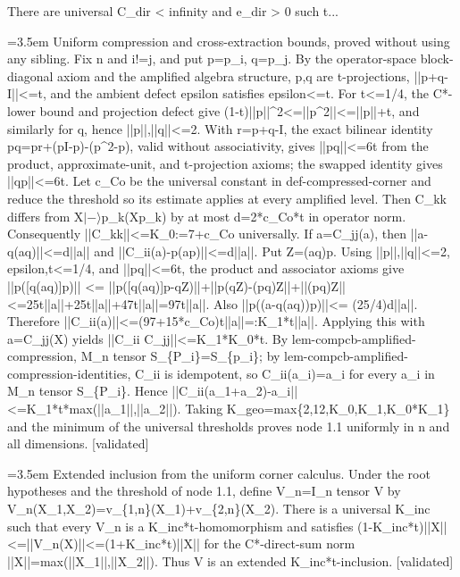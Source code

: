 \documentclass{article}
\newcommand{\step}[1]{\par\noindent\hangindent=3.5em\hangafter=1%
  \makebox[3.5em][l]{\textbf{#1.}}}
\newcommand{\steptag}[1]{\hfill{\small\textsf{[#1]}}}
\begin{document}
\begin{proofbox}{There are universal C\_dir < infinity and e\_dir > 0 such t...}
\step{1.1.2} Uniform compression and cross-extraction bounds, proved without using any sibling. Fix n and i!=j, and put p=p\_i, q=p\_j. By the operator-space block-diagonal axiom and the amplified algebra structure, p,q are t-projections, ||p+q-I||<=t, and the ambient defect epsilon satisfies epsilon<=t. For t<=1/4, the C*-lower bound and projection defect give (1-t)||p||\textasciicircum{}2<=||p\textasciicircum{}2||<=||p||+t, and similarly for q, hence ||p||,||q||<=2. With r=p+q-I, the exact bilinear identity pq=pr+(pI-p)-(p\textasciicircum{}2-p), valid without associativity, gives ||pq||<=6t from the product, approximate-unit, and t-projection axioms; the swapped identity gives ||qp||<=6t. Let c\_Co be the universal constant in def-compressed-corner and reduce the threshold so its estimate applies at every amplified level. Then C\_kk differs from X$|-\rangle$p\_k(Xp\_k) by at most d=2*c\_Co*t in operator norm. Consequently ||C\_kk||<=K\_0:=7+c\_Co universally. If a=C\_jj(a), then ||a-q(aq)||<=d||a|| and ||C\_ii(a)-p(ap)||<=d||a||. Put Z=(aq)p. Using ||p||,||q||<=2, epsilon,t<=1/4, and ||pq||<=6t, the product and associator axioms give ||p([q(aq)]p)|| <= ||p([q(aq)]p-qZ)||+||p(qZ)-(pq)Z||+||(pq)Z|| <=25t||a||+25t||a||+47t||a||=97t||a||. Also ||p((a-q(aq))p)||<= (25/4)d||a||. Therefore ||C\_ii(a)||<=(97+15*c\_Co)t||a||=:K\_1*t||a||. Applying this with a=C\_jj(X) yields ||C\_ii C\_jj||<=K\_1*K\_0*t. By lem-compcb-amplified-compression, M\_n tensor S\_\{P\_i\}=S\_\{p\_i\}; by lem-compcb-amplified-compression-identities, C\_ii is idempotent, so C\_ii(a\_i)=a\_i for every a\_i in M\_n tensor S\_\{P\_i\}. Hence ||C\_ii(a\_1+a\_2)-a\_i||<=K\_1*t*max(||a\_1||,||a\_2||). Taking K\_geo=max\{2,12,K\_0,K\_1,K\_0*K\_1\} and the minimum of the universal thresholds proves node 1.1 uniformly in n and all dimensions. \steptag{validated} \\[4pt]
\step{1.2} Extended inclusion from the uniform corner calculus. Under the root hypotheses and the threshold of node 1.1, define V\_n=I\_n tensor V by V\_n(X\_1,X\_2)=v\_\{1,n\}(X\_1)+v\_\{2,n\}(X\_2). There is a universal K\_inc such that every V\_n is a K\_inc*t-homomorphism and satisfies (1-K\_inc*t)||X||<=||V\_n(X)||<=(1+K\_inc*t)||X|| for the C*-direct-sum norm ||X||=max(||X\_1||,||X\_2||). Thus V is an extended K\_inc*t-inclusion. \steptag{validated} \\[6pt]

\end{proofbox}
\end{document}
